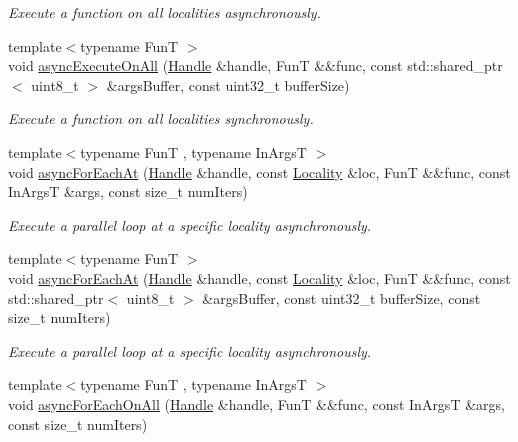 \begin{DoxyCompactItemize}
\begin{DoxyCompactList}\small\item\em Execute a function on all localities asynchronously. \end{DoxyCompactList}\item 
{\footnotesize template$<$typename Fun\-T $>$ }\\void \hyperlink{namespaceshad_1_1rt_aafcdb9446fa49c00add25b4cf61f92f0}{async\-Execute\-On\-All} (\hyperlink{classshad_1_1rt_1_1Handle}{Handle} \&handle, Fun\-T \&\&func, const std\-::shared\-\_\-ptr$<$ uint8\-\_\-t $>$ \&args\-Buffer, const uint32\-\_\-t buffer\-Size)
\begin{DoxyCompactList}\small\item\em Execute a function on all localities synchronously. \end{DoxyCompactList}\item 
{\footnotesize template$<$typename Fun\-T , typename In\-Args\-T $>$ }\\void \hyperlink{namespaceshad_1_1rt_a36e675e25238d9b5c81b8a755dce61cd}{async\-For\-Each\-At} (\hyperlink{classshad_1_1rt_1_1Handle}{Handle} \&handle, const \hyperlink{classshad_1_1rt_1_1Locality}{Locality} \&loc, Fun\-T \&\&func, const In\-Args\-T \&args, const size\-\_\-t num\-Iters)
\begin{DoxyCompactList}\small\item\em Execute a parallel loop at a specific locality asynchronously. \end{DoxyCompactList}\item 
{\footnotesize template$<$typename Fun\-T $>$ }\\void \hyperlink{namespaceshad_1_1rt_a8f5647851b74b49dc7c35d5025b07cf3}{async\-For\-Each\-At} (\hyperlink{classshad_1_1rt_1_1Handle}{Handle} \&handle, const \hyperlink{classshad_1_1rt_1_1Locality}{Locality} \&loc, Fun\-T \&\&func, const std\-::shared\-\_\-ptr$<$ uint8\-\_\-t $>$ \&args\-Buffer, const uint32\-\_\-t buffer\-Size, const size\-\_\-t num\-Iters)
\begin{DoxyCompactList}\small\item\em Execute a parallel loop at a specific locality asynchronously. \end{DoxyCompactList}\item 
{\footnotesize template$<$typename Fun\-T , typename In\-Args\-T $>$ }\\void \hyperlink{namespaceshad_1_1rt_a540b5cecb449199c0c829141cc2ae7d5}{async\-For\-Each\-On\-All} (\hyperlink{classshad_1_1rt_1_1Handle}{Handle} \&handle, Fun\-T \&\&func, const In\-Args\-T \&args, const size\-\_\-t num\-Iters)

\end{DoxyCompactItemize}
